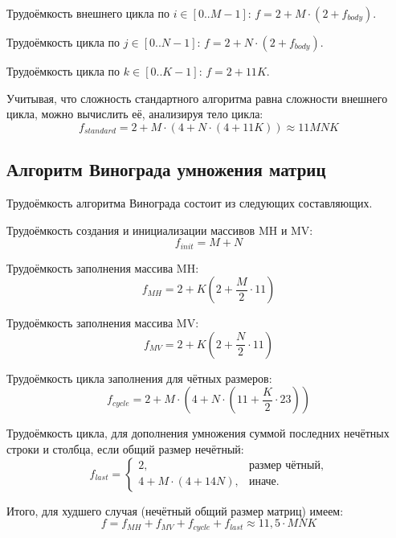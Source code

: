 Трудоёмкость внешнего цикла по $i \in [0..M-1]$: $f = 2 + M \cdot (2 + f_{body})$.

Трудоёмкость цикла по $j \in [0..N-1]$: $f = 2 + N \cdot (2 + f_{body})$.

Трудоёмкость цикла по $k \in [0..K-1]$: $f = 2 + 11K$.

Учитывая, что сложность стандартного алгоритма равна сложности внешнего цикла, можно вычислить её, анализируя тело цикла:
\begin{equation}
	\label{for:standard}
	f_{standard} = 2 + M \cdot (4 + N \cdot (4 + 11K)) \approx 11MNK
\end{equation}

\subsection{Алгоритм Винограда умножения матриц}
Трудоёмкость алгоритма Винограда состоит из следующих составляющих.

Трудоёмкость создания и инициализации массивов MH и MV:
\begin{equation}
	\label{for:init}
	f_{init} = M + N
\end{equation}

Трудоёмкость заполнения массива MH:
\begin{equation}
	\label{for:MH}
	f_{MH} = 2 + K (2 + \frac{M}{2} \cdot 11)
\end{equation}

Трудоёмкость заполнения массива MV:
\begin{equation}
	\label{for:MV}
	f_{MV} = 2 + K (2 + \frac{N}{2} \cdot 11)
\end{equation}

Трудоёмкость цикла заполнения для чётных размеров:
\begin{equation}
	\label{for:cycle}
	f_{cycle} = 2 + M \cdot (4 + N \cdot (11 + \frac{K}{2} \cdot 23))
\end{equation}

Трудоёмкость цикла, для дополнения умножения суммой последних нечётных строки и столбца, если общий размер нечётный:
\begin{equation}
	\label{for:last}
	f_{last} = \begin{cases}
		2, & \text{размер чётный,}\\
		4 + M \cdot (4 + 14N), & \text{иначе.}
	\end{cases}
\end{equation}


Итого, для худшего случая (нечётный общий размер матриц) имеем:
\begin{equation}
	\label{for:bad}
	f =  f_{MH} + f_{MV} + f_{cycle} + f_{last}\approx 11,5 \cdot MNK
\end{equation}

